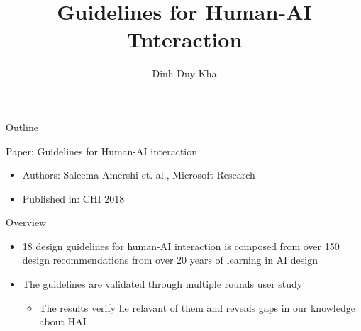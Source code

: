 \documentclass[presentation]{beamer}
\author{Dinh Duy Kha}
\date{}
\title{Guidelines for Human-AI Tnteraction}
\begin{document}
\maketitle
\begin{frame}{Outline}
\tableofcontents
\end{frame}


\begin{frame}[label={sec:org0bc890a}]{Paper: Guidelines for Human-AI interaction}
\begin{itemize}
\item Authors: Saleema Amershi et. al., Microsoft Research
\item Published in: CHI 2018
\end{itemize}
\begin{block}{Overview}
\begin{itemize}
\item 18 design guidelines for human-AI interaction is composed from over 150 design recommendations from over 20 years of learning in AI design
\item The guidelines are validated through multiple rounds user study
\begin{itemize}
\item The results verify he relavant of them and reveals gaps in our knowledge about HAI
\end{itemize}
\end{itemize}
\end{block}
\end{frame}
\end{document}
